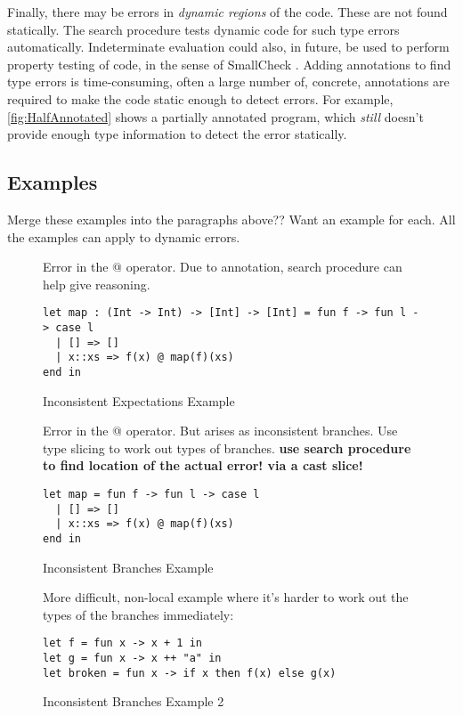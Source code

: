 Finally, there may be errors in \textit{dynamic regions} of the code. These are not found statically. The search procedure tests dynamic code for such type errors automatically. Indeterminate evaluation could also, in future, be used to perform property testing of code, in the sense of SmallCheck \cite{SmallCheck}. Adding annotations to find type errors is time-consuming, often a large number of, concrete, annotations are required to make the code static enough to detect errors. For example, \cref{fig:HalfAnnotated} shows a partially annotated program, which \textit{still} doesn't provide enough type information to detect the error statically.

\subsection{Examples}
Merge these examples into the paragraphs above?? Want an example for each. All the examples can apply to dynamic errors.

\begin{figure}[h]
Error in the @ operator. Due to annotation, search procedure can help give reasoning.
\begin{lstlisting}
let map : (Int -> Int) -> [Int] -> [Int] = fun f -> fun l -> case l 
  | [] => []
  | x::xs => f(x) @ map(f)(xs)
end in  
\end{lstlisting}
\caption{Inconsistent Expectations Example}
\end{figure}

\begin{figure}[h]
Error in the @ operator. But arises as inconsistent branches. Use type slicing to work out types of branches. \textbf{use search procedure to find location of the actual error! via a cast slice!}
\begin{lstlisting}
let map = fun f -> fun l -> case l 
  | [] => []
  | x::xs => f(x) @ map(f)(xs)
end in  
\end{lstlisting}
\caption{Inconsistent Branches Example}
\end{figure}

\begin{figure}
More difficult, non-local example where it's harder to work out the types of the branches immediately:
\begin{lstlisting}
let f = fun x -> x + 1 in
let g = fun x -> x ++ "a" in 
let broken = fun x -> if x then f(x) else g(x)
\end{lstlisting}
\caption{Inconsistent Branches Example 2}
\end{figure}

